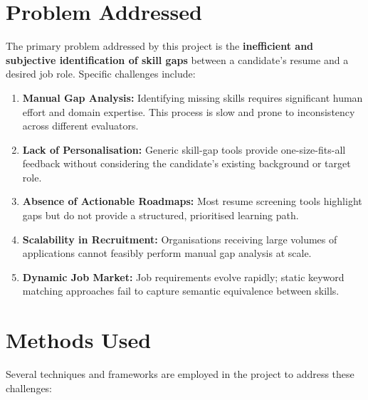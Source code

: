 \documentclass[12pt,a4paper]{report}
\begin{document}
\section{Problem Addressed}

The primary problem addressed by this project is the \textbf{inefficient and
subjective identification of skill gaps} between a candidate's resume and a
desired job role. Specific challenges include:

\begin{enumerate}
  \item \textbf{Manual Gap Analysis:} Identifying missing skills requires
        significant human effort and domain expertise. This process is slow and
        prone to inconsistency across different evaluators.
  \item \textbf{Lack of Personalisation:} Generic skill-gap tools provide
        one-size-fits-all feedback without considering the candidate's existing
        background or target role.
  \item \textbf{Absence of Actionable Roadmaps:} Most resume screening tools
        highlight gaps but do not provide a structured, prioritised learning path.
  \item \textbf{Scalability in Recruitment:} Organisations receiving large
        volumes of applications cannot feasibly perform manual gap analysis at
        scale.
  \item \textbf{Dynamic Job Market:} Job requirements evolve rapidly; static
        keyword matching approaches fail to capture semantic equivalence between
        skills.
\end{enumerate}

\section{Methods Used}

Several techniques and frameworks are employed in the project to address these
challenges:
\end{document}
